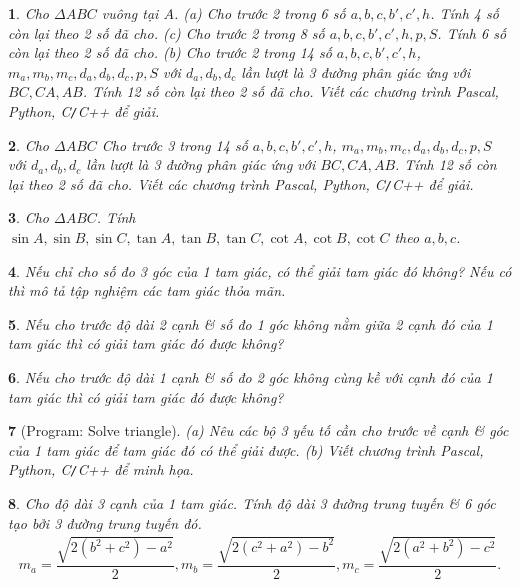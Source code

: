 \documentclass{article}
\newtheorem{baitoan}{}
\begin{document}
\begin{baitoan}
	Cho $\Delta ABC$ vuông tại $A$. (a) Cho trước 2 trong 6 số $a,b,c,b',c',h$. Tính 4 số còn lại theo 2 số đã cho. (c) Cho trước 2 trong 8 số $a,b,c,b',c',h,p,S$. Tính 6 số còn lại theo 2 số đã cho. (b) Cho trước 2 trong 14 số $a,b,c,b',c',h$, $m_a,m_b,m_c,d_a,d_b,d_c,p,S$ với $d_a,d_b,d_c$ lần lượt là 3 đường phân giác ứng với $BC,CA,AB$. Tính 12 số còn lại theo 2 số đã cho. Viết các chương trình {\sf Pascal, Python, C{\tt/}C++} để giải.
\end{baitoan}

\begin{baitoan}
	Cho $\Delta ABC$ Cho trước 3 trong 14 số $a,b,c,b',c',h$, $m_a,m_b,m_c,d_a,d_b,d_c,p,S$ với $d_a,d_b,d_c$ lần lượt là 3 đường phân giác ứng với $BC,CA,AB$. Tính 12 số còn lại theo 2 số đã cho. Viết các chương trình {\sf Pascal, Python, C{\tt/}C++} để giải.
\end{baitoan}

\begin{baitoan}
	Cho $\Delta ABC$. Tính $\sin A,\sin B,\sin C,\tan A,\tan B,\tan C,\cot A,\cot B,\cot C$ theo $a,b,c$.
\end{baitoan}

\begin{baitoan}
	Nếu chỉ cho số đo 3 góc của 1 tam giác, có thể giải tam giác đó không? Nếu có thì mô tả tập nghiệm các tam giác thỏa mãn.
\end{baitoan}

\begin{baitoan}
	Nếu cho trước độ dài 2 cạnh \& số đo 1 góc không nằm giữa 2 cạnh đó của 1 tam giác thì có giải tam giác đó được không?
\end{baitoan}

\begin{baitoan}
	Nếu cho trước độ dài 1 cạnh \& số đo 2 góc không cùng kề với cạnh đó của 1 tam giác thì có giải tam giác đó được không?
\end{baitoan}

\begin{baitoan}[{\sf Program: Solve triangle}]
	(a) Nêu các bộ 3 yếu tố cần cho trước về cạnh \& góc của 1 tam giác để tam giác đó có thể giải được. (b) Viết chương trình {\sf Pascal, Python, C{\tt/}C++} để minh họa.
\end{baitoan}

\begin{baitoan}
	Cho độ dài 3 cạnh của 1 tam giác. Tính độ dài 3 đường trung tuyến \& 6 góc tạo bởi 3 đường trung tuyến đó.
	\begin{align*}
		m_a = \dfrac{\sqrt{2(b^2 + c^2) - a^2}}{2},m_b = \dfrac{\sqrt{2(c^2 + a^2) - b^2}}{2},m_c = \dfrac{\sqrt{2(a^2 + b^2) - c^2}}{2}.
	\end{align*}
\end{baitoan}
\end{document}
